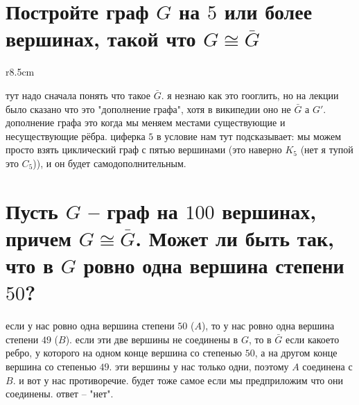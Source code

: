 \documentclass{article}
\begin{document}
  \clearpage
  \section{Постройте граф $G$ на $5$ или более вершинах, такой что $G \cong \bar{G}$}
  \begin{wrapfigure}{r}{8.5cm}
    \vspace{-.5cm}
    \hfill
    \vspace{-1cm}
  \end{wrapfigure}
  тут надо сначала понять что такое $\bar{G}$.
  я незнаю как это гооглить, но на лекции было сказано что это "{}дополнение графа"{}, хотя в википедии оно не $\bar{G}$ а $G'$.
  дополнение графа это когда мы меняем местами существующие и несуществующие рёбра.
  циферка $5$ в условие нам тут подсказывает: мы можем просто взять циклический граф с пятью вершинами
  (это наверно $K_5$ (нет я тупой это $C_5$)),
  и он будет самодополнительным.

  \section{Пусть $G$ -- граф на $100$ вершинах, причем $G \cong \bar{G}$. Может ли быть так, что в $G$ ровно одна вершина степени $50$?}
  если у нас ровно одна вершина степени $50$ ($A$), то у нас ровно одна вершина степени $49$ ($B$).
  если эти две вершины не соединены в $G$, то в $\bar{G}$ если какоето ребро,
  у которого на одном конце вершина со степенью $50$, а на другом конце вершина со степенью $49$.
  эти вершины у нас только одни, поэтому $A$ соединена с $B$.
  и вот у нас противоречие.
  будет тоже самое если мы предприложим что они соединены.
  ответ -- "{}нет"{}.
\end{document}
